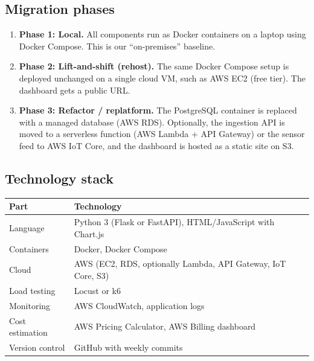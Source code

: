 \documentclass[12pt,a4paper]{article}
\begin{document}
\subsection{Migration phases}
\begin{enumerate}
  \item \textbf{Phase 1: Local.} All components run as Docker containers on a laptop using Docker Compose. This is our
        ``on-premises'' baseline.
  \item \textbf{Phase 2: Lift-and-shift (rehost).} The same Docker Compose setup is deployed unchanged on a single
        cloud VM, such as AWS EC2 (free tier). The dashboard gets a public URL.
  \item \textbf{Phase 3: Refactor / replatform.} The PostgreSQL container is replaced with a managed database
        (AWS RDS). Optionally, the ingestion API is moved to a serverless function (AWS Lambda + API Gateway) or the
        sensor feed to AWS IoT Core, and the dashboard is hosted as a static site on S3.
\end{enumerate}

\subsection{Technology stack}
\begin{center}
\begin{tabularx}{\linewidth}{@{}p{3.6cm}L@{}}
\toprule
\textbf{Part} & \textbf{Technology} \\
\midrule
Language & Python 3 (Flask or FastAPI), HTML/JavaScript with Chart.js \\
Containers & Docker, Docker Compose \\
Cloud & AWS (EC2, RDS, optionally Lambda, API Gateway, IoT Core, S3) \\
Load testing & Locust or k6 \\
Monitoring & AWS CloudWatch, application logs \\
Cost estimation & AWS Pricing Calculator, AWS Billing dashboard \\
Version control & GitHub with weekly commits \\
\bottomrule
\end{tabularx}
\end{center}
\end{document}
